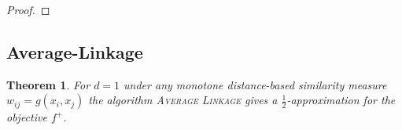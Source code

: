 \documentclass{article}
\newtheorem{theorem}{Theorem}[section]
\begin{document}
\begin{proof}
%



\end{proof}

\subsection{Average-Linkage}
\begin{theorem}\label{thm:average-linkage}
For $d = 1$ under any monotone distance-based similarity measure $w_{ij} = g(x_i, x_j)$ the algorithm \textsc{Average Linkage} gives a $\frac12$-approximation for the objective $f^+$.
\end{theorem}
\end{document}
